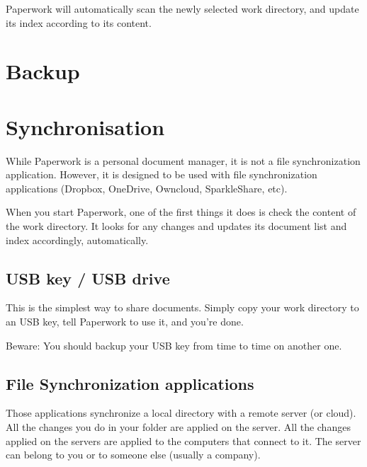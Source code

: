 \documentclass[10pt,a4paper]{article}
\begin{document}

Paperwork will automatically scan the newly selected work directory,
and update its index according to its content.

\section{Backup}

\section{Synchronisation}

While Paperwork is a personal document manager, it is not a file synchronization
application. However, it is designed to be used with file synchronization
applications (Dropbox, OneDrive, Owncloud, SparkleShare, etc).

When you start Paperwork, one of the first things it does is check
the content of the work directory. It looks for any changes and updates
its document list and index accordingly, automatically.

\subsection{USB key / USB drive}

This is the simplest way to share documents. Simply copy your work
directory to an USB key, tell Paperwork to use it, and you're done.

Beware: You should backup your USB key from time to time on another
one.

\subsection{File Synchronization applications}

Those applications synchronize a local directory with a remote server
(or cloud). All the changes you do in your folder are applied on the
server. All the changes applied on the servers are applied to the
computers that connect to it. The server can belong to you or to someone
else (usually a company).
\end{document}
